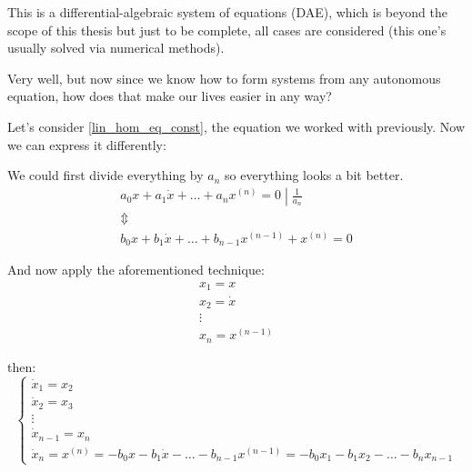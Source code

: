 This is a differential-algebraic system of equations (DAE), which is beyond the scope of this thesis but just to be complete, all cases are considered (this one's usually solved via numerical methods).

Very well, but now since we know how to form systems from any autonomous equation, how does that make our lives easier in any way?

Let's consider \ref{lin_hom_eq_const}, the equation we worked with previously. Now we can express it differently:

We could first divide everything by $a_{n}$ so everything looks a bit better.
\begin{gather*}
	\left. a_0 x + a_1\dot{x}+ \dots +a_{n} x^{(n)} = 0 \middle| \frac{1}{a_{n}} \right. \\
	\Updownarrow \\
	b_0 x + b_1\dot{x} + \dots + b_{n-1} x^{(n-1)} + x^{(n)} = 0
\end{gather*}

And now apply the aforementioned technique:
\begin{gather*}
	x_1 = x     \\
	x_2 = \dot{x} \\
	\vdots \\
	x_n = x^{(n-1)}
\end{gather*}

then:
\[
	\begin{cases}
		\dot{x}_1 = x_2     \\
		\dot{x}_2 = x_3     \\
		\vdots              \\
		\dot{x}_{n-1} = x_n \\
		\dot{x}_n  = x^{(n)} = -b_0x - b_1\dot{x} - \dots - b_{n-1} x^{(n-1)} = -b_0 x_1 - b_1 x_2 - \dots - b_n x_{n-1}
	\end{cases}
\]


